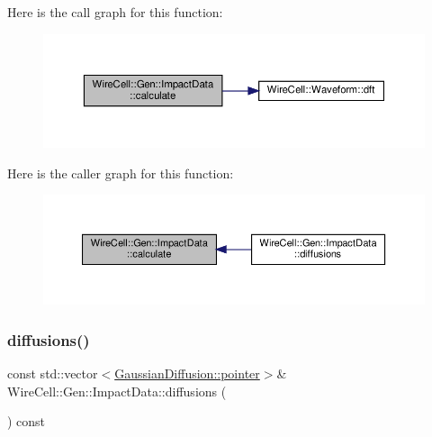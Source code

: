 Here is the call graph for this function\+:
\nopagebreak
\begin{figure}[H]
\begin{center}
\leavevmode
\includegraphics[width=350pt]{class_wire_cell_1_1_gen_1_1_impact_data_a323019d50d44dea084f1691da674b755_cgraph}
\end{center}
\end{figure}
Here is the caller graph for this function\+:
\nopagebreak
\begin{figure}[H]
\begin{center}
\leavevmode
\includegraphics[width=350pt]{class_wire_cell_1_1_gen_1_1_impact_data_a323019d50d44dea084f1691da674b755_icgraph}
\end{center}
\end{figure}
\mbox{\label{class_wire_cell_1_1_gen_1_1_impact_data_a90443997dcd6a04fafe2f1c1fbd90bce}} 
\subsubsection{\texorpdfstring{diffusions()}{diffusions()}}
{\footnotesize\ttfamily const std\+::vector$<$\hyperlink{class_wire_cell_1_1_gen_1_1_gaussian_diffusion_ac7fce7070c18877fa61abc26ad410ce9}{Gaussian\+Diffusion\+::pointer}$>$\& Wire\+Cell\+::\+Gen\+::\+Impact\+Data\+::diffusions (\begin{DoxyParamCaption}{ }\end{DoxyParamCaption}) const\hspace{0.3cm}{\ttfamily [inline]}}



